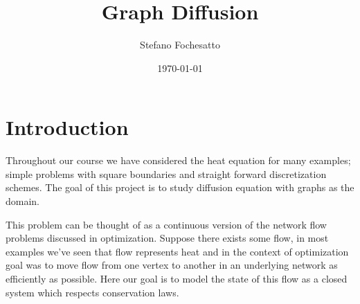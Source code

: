 \documentclass[11pt]{article}
\begin{document}
\title{Graph Diffusion}

\author{Stefano Fochesatto}

\date{\today}

\maketitle

\section{Introduction}  
Throughout our course we have considered the heat equation for many examples; simple 
problems with square boundaries and straight forward discretization schemes. The goal of this project
is to study diffusion equation with graphs as the domain. 

This problem can be thought of as a continuous version of the network flow problems discussed in optimization. 
Suppose there exists some flow, in most examples we've seen that flow represents heat and in the context of optimization
goal was to move flow from one vertex to another in an underlying network as efficiently as possible. Here 
our goal is to model the state of this flow as a closed system which respects conservation laws. 












\end{document}
